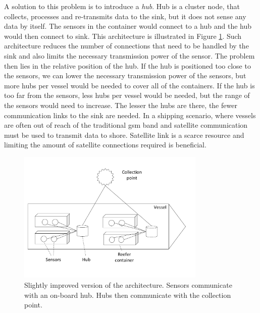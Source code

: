 A solution to this problem is to introduce a \textit{hub}. Hub is a cluster node, that collects, processes and re-transmits data to the sink, but it does not sense any data by itself. The sensors in the container would connect to a hub and the hub would then connect to sink. This architecture is illustrated in Figure \ref{fig:arch-ver2}. Such architecture reduces the number of connections that need to be handled by the sink and also limits the necessary transmission power of the sensor. The problem then lies in the relative position of the hub. If the hub is positioned too close to the sensors, we can lower the necessary transmission power of the sensors, but more hubs per vessel would be needed to cover all of the containers. If the hub is too far from the sensors, less hubs per vessel would be needed, but the range of the sensors would need to increase. The lesser the hubs are there, the fewer communication links to the sink are needed. In a shipping scenario, where vessels are often out of reach of the traditional \acrshort{gsm} band and satellite communication must be used to transmit data to shore. Satellite link is a scarce resource and limiting the amount of satellite connections required is beneficial.

\begin{figure}[ht]
    \centering
    \includegraphics[width=0.8\textwidth]{00images/arch-ver2}
    \caption{Slightly improved version of the architecture. Sensors communicate with an on-board hub. Hubs then communicate with the collection point. }
    \label{fig:arch-ver2}
\end{figure}

